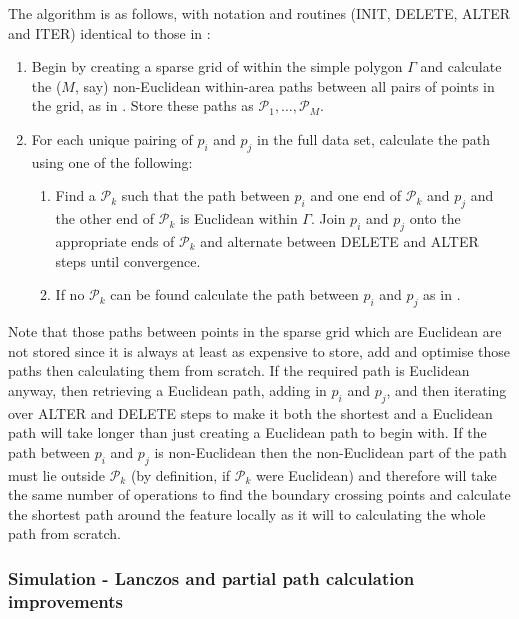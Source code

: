 The algorithm is as follows, with notation and routines (INIT, DELETE, ALTER and ITER) identical to those in :
\begin{enumerate}
 \item Begin by creating a sparse grid of within the simple polygon $\Gamma$ and calculate the ($M$, say) non-Euclidean within-area paths between all pairs of points in the grid, as in . Store these paths as $\mathcal{P}_1,\ldots, \mathcal{P}_M$.
\item For each unique pairing of $p_i$ and $p_j$ in the full data set, calculate the path using one of the following:
	\begin{enumerate}
	\item Find a $\mathcal{P}_k$ such that the path between $p_i$ and one end of $\mathcal{P}_k$ and $p_j$ and the other end of $\mathcal{P}_k$ is Euclidean within $\Gamma$. Join $p_i$ and $p_j$ onto the appropriate ends of $\mathcal{P}_k$ and alternate between DELETE and ALTER steps until convergence.
	\item If no $\mathcal{P}_k$ can be found calculate the path between $p_i$ and $p_j$ as in . 
	\end{enumerate}
\end{enumerate}

Note that those paths between points in the sparse grid which are Euclidean are not stored since it is always at least as expensive to store, add and optimise those paths then calculating them from scratch. If the required path is Euclidean anyway, then retrieving a Euclidean path, adding in $p_i$ and $p_j$, and then iterating over ALTER and DELETE steps to make it both the shortest and a Euclidean path will take longer than just creating a Euclidean path to begin with. If the path between $p_i$ and $p_j$ is non-Euclidean then the non-Euclidean part of the path must lie outside $\mathcal{P}_k$ (by definition, if $\mathcal{P}_k$ were Euclidean) and therefore will take the same number of operations to find the boundary crossing points and calculate the shortest path around the feature locally as it will to calculating the whole path from scratch.


\subsubsection{Simulation - Lanczos and partial path calculation improvements}

